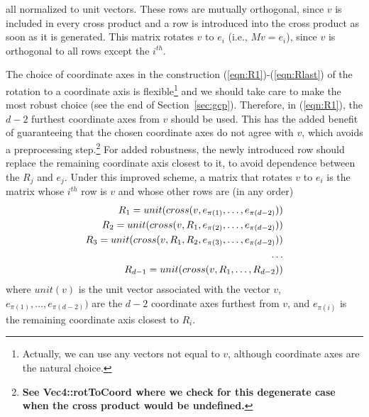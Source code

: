 \documentclass[10pt]{article}
\begin{document}
all normalized to unit vectors.
These rows are mutually orthogonal, since $v$ is included in every cross product
and a row is introduced into the cross product as soon as it is generated.
This matrix rotates $v$ to $e_i$ (i.e., $Mv = e_i$), 
since $v$ is orthogonal to all rows except the $i^{th}$.

The choice of coordinate axes in the construction (\ref{eqn:R1})-(\ref{eqn:Rlast})
of the rotation to a coordinate axis is flexible\footnote{Actually, we 
  can use any vectors not equal to $v$, although coordinate axes are the 
  natural choice.}
and we should take care to make the most robust choice (see the end of 
Section~\ref{sec:gcp}).
Therefore, in (\ref{eqn:R1}), 
the $d-2$ furthest coordinate axes from $v$ should be used.
This has the added benefit of guaranteeing that the chosen coordinate axes
do not agree with $v$, which avoids a preprocessing step.\footnote{{\bf See
    Vec4::rotToCoord where we check for this degenerate case 
    when the cross product would be undefined.}}
For added robustness, the newly introduced row should replace the remaining 
coordinate axis closest to it, to avoid dependence between the $R_j$ and $e_j$.
Under this improved scheme, a matrix that rotates $v$ to $e_i$ is the matrix
whose $i^{th}$ row is $v$ and whose other rows are (in any order)
\begin{eqnarray}
R_1 = unit(cross (v,e_{\pi(1)},         \ldots,e_{\pi(d-2)})) \\
R_2 = unit(cross (v,R_1,e_{\pi(2)},     \ldots,e_{\pi(d-2)})) \\
R_3 = unit(cross (v,R_1,R_2,e_{\pi(3)}, \ldots,e_{\pi(d-2)})) \\
\ldots \hfill \\
R_{d-1} = unit(cross (v,R_1,\ldots,R_{d-2}))
\end{eqnarray}
where $unit(v)$ is the unit vector associated with the vector $v$,
$e_{\pi(1)},\ldots,e_{\pi(d-2)})$ are the $d-2$ coordinate axes furthest from $v$,
and $e_{\pi(i)}$ is the remaining coordinate axis closest to $R_i$.
\end{document}
